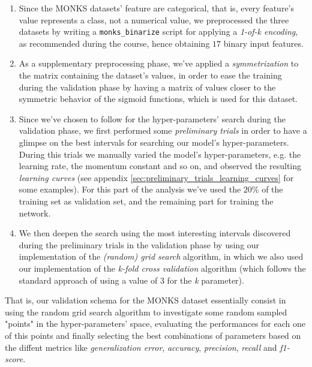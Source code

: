 \documentclass[11pt,twoside]{article}
\begin{document}
    \begin{enumerate}
        \item Since the MONKS datasets' feature are categorical, that is, every feature's value represents a
        class, not a numerical value, we preprocessed the three datasets by writing a \texttt{monks\_binarize}
        script for applying a \textit{1-of-k encoding}, as recommended during the course, hence obtaining
        $17$ binary input features.
        \item As a supplementary preprocessing phase, we've applied a \textit{symmetrization} to the matrix
        containing the dataset's values, in order to ease the training during the validation phase by having
        a matrix of values closer to the symmetric behavior of the sigmoid functions, which is used for this
        dataset.
        \item Since we've chosen to follow \cite{random_search} for the hyper-parameters' search during the
        validation phase, we first performed some \textit{preliminary trials} in order to have a glimpse on
        the best intervals for searching our model's hyper-parameters. During this trials we manually varied
        the model's hyper-parameters, e.g. the learning rate, the momentum constant and so on, and observed
        the resulting \textit{learning curves} (see appendix \ref{sec:preliminary_trials_learning_curves} for
        some examples). For this part of the analysis we've used the $20\%$ of the training set as validation
        set, and the remaining part for training the network.
        \item We then deepen the search using the most interesting intervals discovered during the
        preliminary trials in the validation phase by using our implementation of the \textit{(random) grid
        search} algorithm, in which we also used our implementation of the \textit{k-fold cross validation}
        algorithm (which follows the standard approach of using a value of $3$ for the \textit{k} parameter).
    \end{enumerate}

    That is, our validation schema for the MONKS dataset essentially consist in using the random grid search
    algorithm to investigate some random sampled "points" in the hyper-parameters' space, evaluating the
    performances for each one of this points and finally selecting the best combinations of parameters based
    on the diffent metrics like \textit{generalization error}, \textit{accuracy}, \textit{precision},
    \textit{recall} and \textit{f1-score}.
\end{document}
